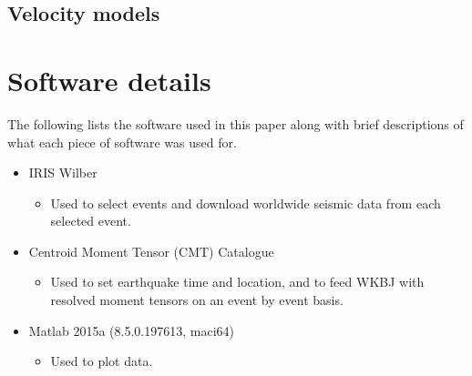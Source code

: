 \documentclass[11pt,a4paper]{article}
\begin{document}
\subsection{Velocity models}


\appendix
\section{Software details}
\label{app:Software}
The following lists the software used in this paper along with brief descriptions of what each piece of software was used for.
\begin{itemize}
	\item IRIS Wilber
	\begin{itemize}
		\item Used to select events and download worldwide seismic data from each selected event.
	\end{itemize}
	\item Centroid Moment Tensor (CMT) Catalogue
	\begin{itemize}
		\item Used to set earthquake time and location, and to feed WKBJ with resolved moment tensors on an event by event basis.
	\end{itemize}
	\item Matlab 2015a (8.5.0.197613, maci64)
	\begin{itemize}
		\item Used to plot data.
	\end{itemize}
\end{itemize}

\newpage


\end{document}
